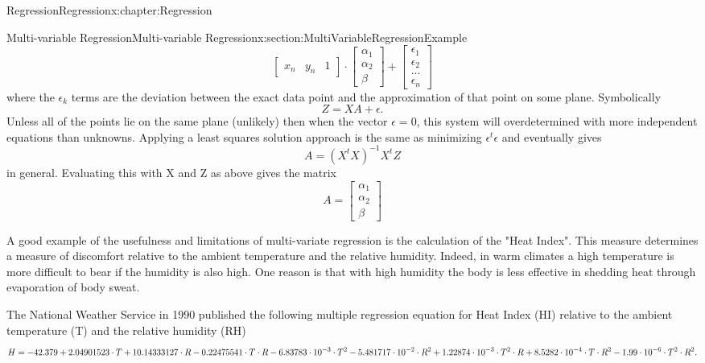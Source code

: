 \documentclass[oneside,10pt,]{book}
\numberwithin{equation}{section}
\newcommand{\amp}{&}
\begin{document}
\begin{chapterptx}{Regression}{}{Regression}{}{}{x:chapter:Regression}
\begin{sectionptx}{Multi-variable Regression}{}{Multi-variable Regression}{}{}{x:section:MultiVariableRegressionExample}
\begin{equation*}
\begin{bmatrix}
x_n \amp y_n \amp 1 
\end{bmatrix} 
\cdot 
\begin{bmatrix}
\alpha_1
\\ 
\alpha_2
\\
\beta
\end{bmatrix}
+
\begin{bmatrix}
\epsilon_1 \\ 
\epsilon_2 \\ 
... \\ 
\epsilon_n 
\end{bmatrix}
\end{equation*}
where the \(\epsilon_k\) terms are the deviation between the exact data point and the approximation of that point on some plane. Symbolically%
\begin{equation*}
Z = XA + \epsilon.
\end{equation*}
Unless all of the points lie on the same plane (unlikely) then when the vector \(\epsilon = 0\), this system will overdetermined with more independent equations than unknowns. Applying a least squares solution approach is the same as minimizing \(\epsilon^t \epsilon\) and eventually gives%
\begin{equation*}
A = (X^t X)^{-1} X^t Z
\end{equation*}
in general.  Evaluating this with X and Z as above gives the matrix%
\begin{equation*}
A = \begin{bmatrix}
\alpha_1 \\ 
\alpha_2 \\  
\beta 
\end{bmatrix}
\end{equation*}
%
\par
A good example of the usefulness and limitations of multi-variate regression is the calculation of the "Heat Index". This measure determines a measure of discomfort relative to the ambient temperature and the relative humidity. Indeed, in warm climates a high temperature is more difficult to bear if the humidity is also high. One reason is that with high humidity the body is less effective in shedding heat through evaporation of body sweat.%
\par
The National Weather Service in 1990 published the following multiple regression equation for Heat Index (HI) relative to the ambient temperature (T) and the relative humidity (RH)%
\begin{equation*}
H = -42.379 + 2.04901523 \cdot T + 10.14333127 \cdot R - 0.22475541 \cdot T \cdot R \\ - 6.83783 \cdot 10^{-3} \cdot T^2 - 5.481717 \cdot 10^{-2} \cdot R^2 + 1.22874 \cdot 10^{-3} \cdot T^2 \cdot R \\ + 8.5282 \cdot 10^{-4} \cdot T \cdot R^2-1.99 \cdot 10^{-6} \cdot T^2 \cdot R^2.

\end{equation*}
\end{sectionptx}
\end{chapterptx}
\end{document}
